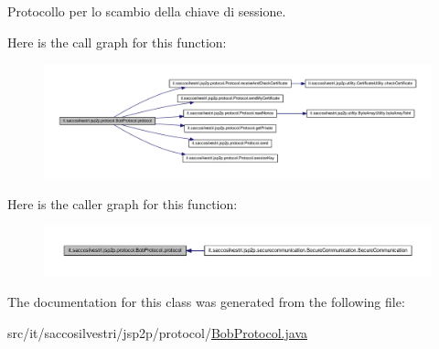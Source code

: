 \-Protocollo per lo scambio della chiave di sessione. 



\-Here is the call graph for this function\-:
\nopagebreak
\begin{figure}[H]
\begin{center}
\leavevmode
\includegraphics[width=350pt]{classit_1_1saccosilvestri_1_1jsp2p_1_1protocol_1_1_bob_protocol_af5e630fb51c6acf73adc5cd5a76017a2_cgraph}
\end{center}
\end{figure}




\-Here is the caller graph for this function\-:
\nopagebreak
\begin{figure}[H]
\begin{center}
\leavevmode
\includegraphics[width=350pt]{classit_1_1saccosilvestri_1_1jsp2p_1_1protocol_1_1_bob_protocol_af5e630fb51c6acf73adc5cd5a76017a2_icgraph}
\end{center}
\end{figure}




\-The documentation for this class was generated from the following file\-:\begin{DoxyCompactItemize}
\item 
src/it/saccosilvestri/jsp2p/protocol/\hyperlink{_bob_protocol_8java}{\-Bob\-Protocol.\-java}\end{DoxyCompactItemize}
